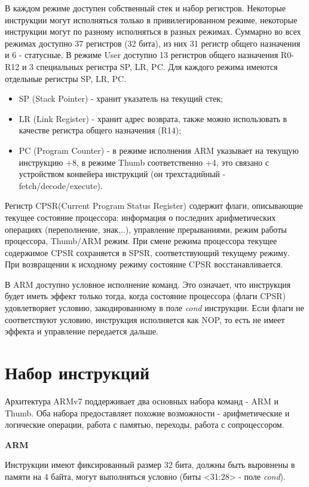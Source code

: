 В каждом режиме доступен собственный стек и набор регистров. Некоторые инструкции могут исполняться только в привилегированном режиме, некоторые инструкции могут по разному исполняться в разных режимах. Суммарно во всех режимах доступно 37 регистров (32 бита), из них 31 регистр общего назначения и 6 - статусные. В режиме User доступно 13 регистров общего назначения R0-R12 и 3 специальных регистра SP, LR, PC. Для каждого режима имеются отдельные регистры SP, LR, PC.

\begin{itemize}
    \item SP (Stack Pointer) - хранит указатель на текущий стек;
    \item LR (Link Register) - хранит адрес возврата, также можно использовать в качестве регистра общего назначения (R14);
    \item PC (Program Counter) - в режиме исполнения ARM указывает на текущую инструкцию +8, в режиме Thumb соответственно +4, это связано с устройством конвейера инструкций (он трехстадийный - fetch/decode/execute).
\end{itemize}

Регистр CPSR(Current Program Status Register) содержит флаги, описывающие текущее состояние процессора: информация о последних арифметических операциях (переполнение, знак,..), управление прерываниями, режим работы процессора, Thumb/ARM режим. При смене режима процессора текущее содержимое CPSR сохраняется в SPSR, соответствующий текущему режиму. При возвращении к исходному режиму состояние CPSR восстанавливается.

В ARM доступно условное исполнение команд. Это означает, что инструкция будет иметь эффект только тогда, когда состояние процессора (флаги CPSR) удовлетворяет условию, закодированному в поле {\it cond} инструкции. Если флаги не соответствуют условию, инструкция исполняется как NOP, то есть не имеет эффекта и управление передается дальше.

\section{Набор инструкций}

Архитектура ARMv7 поддерживает два основных набора команд - ARM и Thumb. Оба набора предоставляет похожие возможности - арифметические и логические операции, работа с памятью, переходы, работа с сопроцессором. 

{\bf ARM}

Инструкции имеют фиксированный размер 32 бита, должны быть выровнены в памяти на 4 байта, могут выполняться условно (биты <31:28> - поле {\it cond}).

